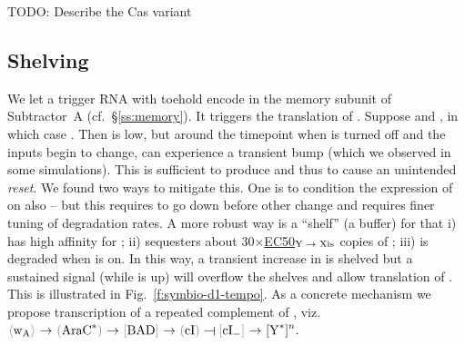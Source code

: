 \documentclass[12pt,notitlepage]{article}
\newcommand{\TODO}[1]{\textrm{\color{red}TODO: #1}}
\newcommand{\XOR}{\ensuremath{\mathop{\mathsf{xor}}}\xspace}
\newcommand{\cbra}[1]{{\ensuremath{\color{gray}{#1}}}}
\newcommand{\signal}[1]{{{\cbra{\langle}\ce{#1}\cbra{\rangle}}}}
\newcommand{\protein}[1]{{{\cbra{(}\ce{#1}\cbra{)}}}}
\newcommand{\promoter}[1]{{{\cbra{[}\ce{#1}\cbra{]}}}}
\newcommand{\act}{\ {\ensuremath{\mathbin{\to}}}\ }
\newcommand{\rep}{\ {\ensuremath{\mathrel{\raisebox{-.3ex}{\rotatebox{90}{\scalebox{1}[1.2]{$\bot$}}}}}}\ }
\newcommand{\ra}[1]{{\color{Blue}#1}}
\begin{document}
\TODO{Describe the Cas variant}
	


\subsection{Shelving}

We let 
\ra{a trigger RNA  with toehold}
encode 
in the memory subunit
of Subtractor~A (cf.~\S\ref{ss:memory}).
%
It triggers the translation of .
%
%
Suppose
 and ,
in which case .
%
%
Then  is low,
but
around the timepoint when 
 is turned off
and the inputs begin to change,
 can experience a transient bump
(which we observed in some simulations).
%
This is sufficient to produce 
and thus to cause an unintended \emph{reset}.
%
We found two ways to mitigate this.
%
One is to condition the expression of 
on  also
--
but this requires  to go down
before other change
and requires 
finer tuning of degradation rates.
%
A more robust way
is a ``shelf'' (a buffer) for 
that 
%
i)
has high affinity for ;
%
ii)
sequesters 
about 
30$\times$\href{https://en.wikipedia.org/wiki/EC50}{EC50}${}_\text{\ce{Y}\act\ce{Xis}}$
copies of ;
%
iii)
is degraded when  is on.
%
In this way, 
a transient increase in  is shelved
but a sustained signal 
(while  is up)
will overflow the shelves and 
allow
translation of .
%
%
This is illustrated in Fig.~\ref{f:symbio-d1-tempo}.
%
%
%
%
As a concrete mechanism
we propose
transcription of 
a repeated complement of ,
viz.~%
$
	\signal{\ce{w_A}} \act \protein{AraC^*} \act \promoter{BAD} 
	\act 
	\protein{cI} \rep \promoter{cI_-} \act
	\ce{[Y^*]^n}
	.
$
%

%



%
%


%



\end{document}
